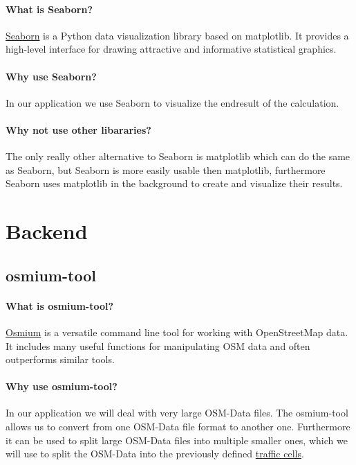 \documentclass[letterpaper,10pt,english]{sphinxmanual}
\begin{document}
\paragraph{What is Seaborn?}
\href{https://seaborn.pydata.org/}{Seaborn} is a Python data visualization library based on matplotlib. It provides a high-level interface for drawing attractive and informative statistical graphics.

\paragraph{Why use Seaborn?}
In our application we use Seaborn to visualize the endresult of the calculation.

\paragraph{Why not use other libararies?}
The only really other alternative to Seaborn is matplotlib which can do the same as Seaborn, but Seaborn is more easily usable then matplotlib, furthermore Seaborn uses matplotlib in the background to create and visualize their results.




\section{Backend}

\subsection{osmium-tool}

\paragraph{What is osmium-tool?}
\href{https://osmcode.org/osmium-tool/}{Osmium}
is a versatile command line tool for working with OpenStreetMap data. It includes many useful functions for manipulating OSM data and often outperforms similar tools.

\paragraph{Why use osmium-tool?}
In our application we will deal with very large OSM-Data files.
The osmium-tool allows us to convert from one OSM-Data file format to another one. 
Furthermore it can be used to split large OSM-Data files into multiple smaller ones, which we will use to split the OSM-Data into the previously defined 
\hyperref[sec:Glossary]{traffic cells}.
\end{document}
